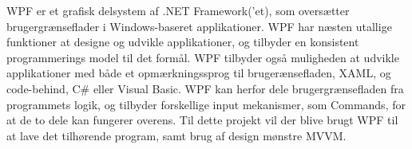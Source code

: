WPF er et grafisk delsystem af .NET Framework(’et), som oversætter brugergrænseflader i Windows-baseret applikationer. WPF har næsten utallige funktioner at designe og udvikle applikationer, og tilbyder en konsistent programmerings model til det formål. WPF tilbyder også muligheden at udvikle applikationer med både et opmærkningssprog til brugerænsefladen, XAML, og code-behind, C\# eller Visual Basic. WPF kan herfor dele brugergrænsefladen fra programmets logik, og tilbyder forskellige input mekanismer, som Commands, for at de to dele kan fungerer overens. Til dette projekt vil der blive brugt WPF til at lave det tilhørende program, samt brug af design mønstre MVVM. \cite{msdn2}
